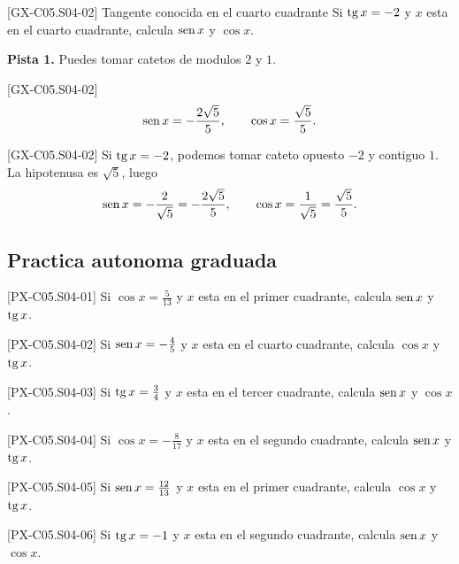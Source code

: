 \begin{guidedexercise}{[GX-C05.S04-02] Tangente conocida en el cuarto cuadrante}
Si \(\operatorname{tg} x=-2\) y \(x\) esta en el cuarto cuadrante, calcula \(\operatorname{sen} x\) y \(\cos x\).

\textbf{Pista 1.} Puedes tomar catetos de modulos \(2\) y \(1\).
\end{guidedexercise}

\begin{shortanswer}{[GX-C05.S04-02]}
\[
\operatorname{sen} x=-\frac{2\sqrt{5}}{5},
\qquad
\cos x=\frac{\sqrt{5}}{5}.
\]
\end{shortanswer}

\begin{fullsolution}{[GX-C05.S04-02]}
Si \(\operatorname{tg} x=-2\), podemos tomar cateto opuesto \(-2\) y contiguo \(1\). La hipotenusa es
\(\sqrt{5}\), luego
\[
\operatorname{sen} x=-\frac{2}{\sqrt{5}}=-\frac{2\sqrt{5}}{5},
\qquad
\cos x=\frac{1}{\sqrt{5}}=\frac{\sqrt{5}}{5}.
\]
\end{fullsolution}

\subsection*{Practica autonoma graduada}
\begin{exercise}{[PX-C05.S04-01] Si \(\cos x=\frac{5}{13}\) y \(x\) esta en el primer cuadrante, calcula \(\operatorname{sen} x\) y \(\operatorname{tg} x\).}
\end{exercise}
\begin{exercise}{[PX-C05.S04-02] Si \(\operatorname{sen} x=-\frac{4}{5}\) y \(x\) esta en el cuarto cuadrante, calcula \(\cos x\) y \(\operatorname{tg} x\).}
\end{exercise}
\begin{exercise}{[PX-C05.S04-03] Si \(\operatorname{tg} x=\frac{3}{4}\) y \(x\) esta en el tercer cuadrante, calcula \(\operatorname{sen} x\) y \(\cos x\).}
\end{exercise}
\begin{exercise}{[PX-C05.S04-04] Si \(\cos x=-\frac{8}{17}\) y \(x\) esta en el segundo cuadrante, calcula \(\operatorname{sen} x\) y \(\operatorname{tg} x\).}
\end{exercise}
\begin{exercise}{[PX-C05.S04-05] Si \(\operatorname{sen} x=\frac{12}{13}\) y \(x\) esta en el primer cuadrante, calcula \(\cos x\) y \(\operatorname{tg} x\).}
\end{exercise}
\begin{exercise}{[PX-C05.S04-06] Si \(\operatorname{tg} x=-1\) y \(x\) esta en el segundo cuadrante, calcula \(\operatorname{sen} x\) y \(\cos x\).}
\end{exercise}

